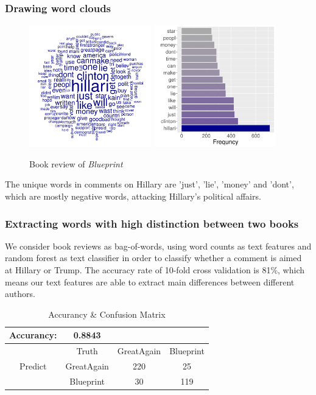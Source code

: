 \documentclass[9pt]{beamer}
\begin{document}
\begin{frame}
\frametitle{Drawing word clouds}
\begin{figure}[H]
	\centering
	\includegraphics[width=150pt]{blue_词云.pdf}
	\includegraphics[width=150pt,height=150pt]{blue_bar.pdf}
	\caption{Book review of \textit{Blueprint}}
\end{figure}
The unique words in comments on Hillary are 'just', 'lie', 'money' and 'dont', which are mostly negative words, attacking Hillary's political affairs.
\end{frame}

\begin{frame}
\frametitle{Extracting words with high distinction between two books}
We consider book reviews as bag-of-words, using word counts as text features and random forest as text classifier in order to classify whether a comment is aimed at Hillary or Trump. The accuracy rate of 10-fold cross validation is 81\%, which means our text features are able to extract main differences between different authors.
\begin{table}[H]
	\centering
	\caption{Accurancy \& Confusion Matrix}
	\begin{tabular}{cccc}
		\hline
		Accurancy: & 0.8843 & & \\
		\hline
		& Truth & GreatAgain & Blueprint \\
		\hline
		Predict & GreatAgain & 220 & 25 \\
		        & Blueprint & 30 & 119 \\
		\hline
	\end{tabular}
\end{table}
\end{frame}
\end{document}
